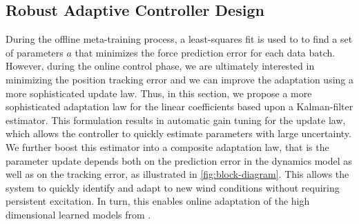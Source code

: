\subsection*{Robust Adaptive Controller Design}
\label{sec:control}
During the offline meta-training process, a least-squares fit is used to to find a set of parameters $a$ that minimizes the force prediction error for each data batch. 
However, during the online control phase, we are ultimately interested in minimizing the position tracking error and we can improve the adaptation using a more sophisticated update law.
Thus, in this section, we propose a more sophisticated adaptation law for the linear coefficients based upon a Kalman-filter estimator. This formulation results in automatic gain tuning for the update law, which allows the controller to quickly estimate parameters with large uncertainty. We further boost this estimator into a composite adaptation law, that is the parameter update depends both on the prediction error in the dynamics model as well as on the tracking error, as illustrated in \cref{fig:block-diagram}. This allows the system to quickly identify and adapt to new wind conditions without requiring persistent excitation. 
In turn, this enables online adaptation of the high dimensional learned models from \DAML.

